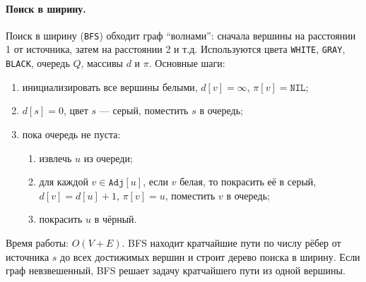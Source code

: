\documentclass[a4paper,12pt]{article}
\begin{document}
\paragraph*{Поиск в ширину.}
Поиск в ширину (\texttt{BFS}) обходит граф ``волнами'': сначала вершины на расстоянии 1 от источника, затем на расстоянии 2 и т.д. Используются цвета \texttt{WHITE}, \texttt{GRAY}, \texttt{BLACK}, очередь \(Q\), массивы \(d\) и \(\pi\). Основные шаги:
\begin{enumerate}
    \item инициализировать все вершины белыми, \(d[v]=\infty\), \(\pi[v]=\texttt{NIL}\);
    \item \(d[s]=0\), цвет \(s\) — серый, поместить \(s\) в очередь;
    \item пока очередь не пуста:
    \begin{enumerate}
        \item извлечь \(u\) из очереди;
        \item для каждой \(v\in\texttt{Adj}[u]\), если \(v\) белая, то покрасить её в серый, \(d[v]=d[u]+1\), \(\pi[v]=u\), поместить \(v\) в очередь;
        \item покрасить \(u\) в чёрный.
    \end{enumerate}
\end{enumerate}
Время работы: \(O(V+E)\). BFS находит кратчайшие пути по числу рёбер от источника \(s\) до всех достижимых вершин и строит дерево поиска в ширину. Если граф невзвешенный, BFS решает задачу кратчайшего пути из одной вершины.
\end{document}
